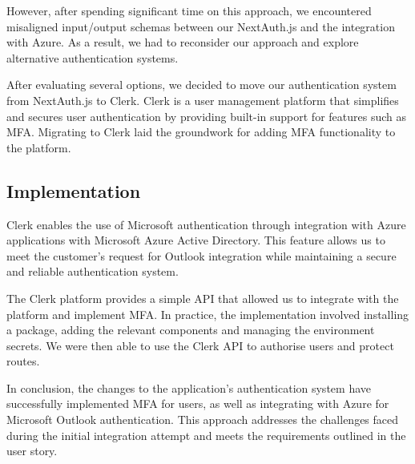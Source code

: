 However, after spending significant time on this approach, we encountered misaligned input/output schemas between our NextAuth.js and the integration with Azure.
As a result, we had to reconsider our approach and explore alternative authentication systems.

After evaluating several options, we decided to move our authentication system from NextAuth.js to Clerk\cite{clerk}.
Clerk is a user management platform that simplifies and secures user authentication by providing built-in support for features such as MFA.
Migrating to Clerk laid the groundwork for adding MFA functionality to the platform.

\subsection*{Implementation}
Clerk enables the use of Microsoft authentication through integration with Azure applications with Microsoft Azure Active Directory\cite{clerkMicrosoft}.
This feature allows us to meet the customer's request for Outlook integration while maintaining a secure and reliable authentication system.

The Clerk platform provides a simple API that allowed us to integrate with the platform and implement MFA.
In practice, the implementation involved installing a package, adding the relevant components and managing the environment secrets.
We were then able to use the Clerk API to authorise users and protect routes.

In conclusion, the changes to the application's authentication system have successfully implemented MFA for users, as well as integrating with Azure for Microsoft Outlook authentication.
This approach addresses the challenges faced during the initial integration attempt and meets the requirements outlined in the user story.



